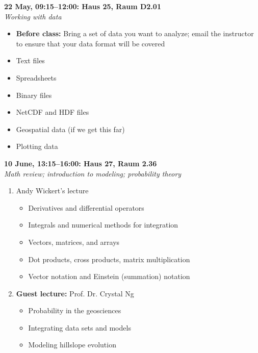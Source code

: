 \documentclass[10pt,a4paper]{amsart}
\begin{document}
\begin{minipage}{\linewidth}
\noindent \textbf{22 May, 09:15--12:00: Haus 25, Raum D2.01}\\
\textit{Working with data}
\begin{itemize}
 \item \textbf{Before class:} Bring a set of data you want to analyze; email the instructor to ensure that your data format will be covered
 \item Text files
 \item Spreadsheets
 \item Binary files
 \item NetCDF and HDF files
 \item Geospatial data (if we get this far)
 \item Plotting data
\end{itemize}
\vspace{12pt}
\end{minipage}

\begin{minipage}{\linewidth}
\noindent \textbf{10 June, 13:15--16:00: Haus 27, Raum 2.36}\\
\textit{Math review; introduction to modeling; probability theory}
\begin{enumerate}
\item Andy Wickert's lecture
\begin{itemize}
 \item Derivatives and differential operators
 \item Integrals and numerical methods for integration
 \item Vectors, matrices, and arrays
 \item Dot products, cross products, matrix multiplication
 \item Vector notation and Einstein (summation) notation
\end{itemize}
\item \textbf{Guest lecture:} Prof. Dr. Crystal Ng
\begin{itemize}
 \item Probability in the geosciences
 \item Integrating data sets and models
 \item Modeling hillslope evolution
\end{itemize}
\end{enumerate}
\vspace{12pt}
\end{minipage}
\end{document}
